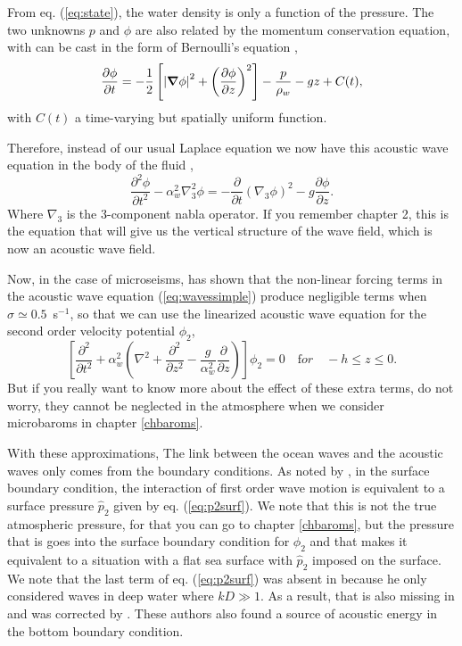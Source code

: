 From eq. (\ref{eq:state}), the water density is only a function of the pressure. 
The two unknowns $p$ and $\phi$ are also related by the momentum conservation equation, 
with can be cast in the form of Bernoulli's equation 
 \citep[see e.g.][section 20]{Lamb1932},
\begin{equation}
    \frac{\partial \phi}{\partial t} = 
    -\frac{1}{2}\left[
    \left|\mbox{\boldmath $\nabla$} \phi\right|^2
    +\left(\frac{\partial \phi}{\partial z}\right)^2
    \right]-\frac{p}{\rho_w} - gz + C(t),
\label{Bernoulli2}
\end{equation}
with $C(t)$ a time-varying but spatially uniform function.

Therefore, instead of our usual Laplace equation we now have this acoustic wave equation in the body of the fluid 
\citep{Brekhovskikh&al.1973}, 
\begin{equation}
    \frac{\partial^2 \phi}{\partial t^2}  -\alpha_w^2 
\nabla_3^2  \phi    =  - \frac{\partial}{\partial t} (\nabla_3 \phi)^2 - g \frac{\partial \phi}{\partial z}. 
\label{eq:wavessimple}
\end{equation}
Where $\nabla_3$ is the 3-component nabla operator. If you remember chapter 2, this is the equation that will give us the vertical structure of the wave field, which is now an acoustic wave field. 

Now, in the case of microseisms, \cite{Longuet-Higgins1950} has shown that the non-linear forcing terms in the acoustic wave equation (\ref{eq:wavessimple}) produce negligible terms when $\sigma\simeq 0.5$~s$^{-1}$, so that we can use 
the linearized acoustic wave equation for the second order velocity potential $\phi_2$, 
\begin{equation}
\left[\frac{\partial^2 }{\partial t^2}  + \alpha_w^2 \left(
\nabla^2 + \frac{\partial^2 }{\partial z^2} - \frac{g}{\alpha_w^2} \frac{\partial }{\partial z} \right) \right]\phi_2   = 0 \quad {\mathrm for} \quad -h \leq z \leq 0. \label{eq:acoustic_linear}
\end{equation}
But if you really want to know more about the effect of these extra terms, do not worry, they cannot be neglected in the atmosphere when we consider microbaroms in chapter \ref{chbaroms}. 

With these approximations, The link between the ocean waves and the acoustic waves only comes from the  boundary conditions. As noted by \cite{Hasselmann1963c}, in the surface boundary condition, the interaction of first order wave motion is equivalent to a surface pressure $\widehat{p}_2$ given by eq. (\ref{eq:p2surf}). 
We note that this is not the true atmospheric pressure, for that you can go to  chapter \ref{chbaroms}, but the pressure that is goes into the surface boundary condition for $\phi_2$ and that makes it equivalent to a situation with a flat sea surface with  $\widehat{p}_2$ imposed on the surface. 
We note that the last term of eq. (\ref{eq:p2surf}) was  absent in \cite{Hasselmann1963c}  because he only considered waves in deep water where $kD  \gg 1$. As a result, that is also missing in  \cite{Webb2007} and was corrected by \cite{Ardhuin&Herbers2013}. These authors also found a source of acoustic energy in the bottom boundary condition.

